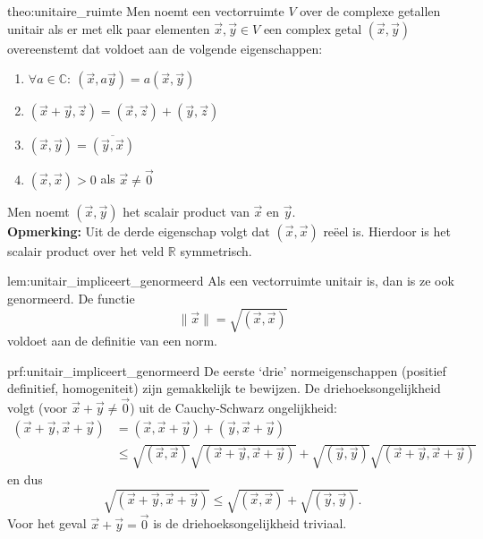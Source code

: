 \begin{theo}{theo:unitaire_ruimte}
    Men noemt een vectorruimte $V$ over de complexe getallen unitair als er met elk paar elementen $\vec{x}, \vec{y} \in V$ een complex getal $(\vec{x},\vec{y})$ overeenstemt dat voldoet aan de volgende eigenschappen:
    \begin{enumerate}
        \item $\forall a \in \mathbb{C}: \ (\vec{x},a\vec{y}) = a(\vec{x},\vec{y})$
        \item $(\vec{x} + \vec{y},\vec{z}) = (\vec{x},\vec{z}) + (\vec{y},\vec{z})$
        \item $(\vec{x},\vec{y}) = \overline{(\vec{y},\vec{x})}$
        \item $(\vec{x},\vec{x}) > 0$ als $\vec{x} \neq \vec{0}$
    \end{enumerate}
    Men noemt $(\vec{x},\vec{y})$ het scalair product van $\vec{x}$ en $\vec{y}$. \\

    \textbf{Opmerking:} Uit de derde eigenschap volgt dat $(\vec{x},\vec{x})$ reëel is. Hierdoor is het scalair product over het veld $\mathbb{R}$ symmetrisch.
\end{theo}

\begin{lem}{lem:unitair_impliceert_genormeerd}
    Als een vectorruimte unitair is, dan is ze ook genormeerd. De functie
    \begin{equation*}
        \| \vec{x} \| = \sqrt{(\vec{x},\vec{x})}
    \end{equation*}
    voldoet aan de definitie van een norm.
\end{lem}

\newpage

\begin{prf}{prf:unitair_impliceert_genormeerd}
    De eerste `drie' normeigenschappen (positief definitief, homogeniteit) zijn gemakkelijk te bewijzen. De driehoeksongelijkheid volgt (voor $\vec{x} + \vec{y} \neq \vec{0}$) uit de Cauchy-Schwarz ongelijkheid:
    \begin{align*}
        (\vec{x} + \vec{y},\vec{x} + \vec{y}) 
            &= (\vec{x}, \vec{x} + \vec{y}) + (\vec{y}, \vec{x} + \vec{y}) \\
            &\leq \sqrt{(\vec{x},\vec{x})} \sqrt{(\vec{x} + \vec{y},\vec{x} + \vec{y})} + \sqrt{(\vec{y},\vec{y})} \sqrt{(\vec{x} + \vec{y},\vec{x} + \vec{y})} 
    \end{align*}
    en dus
    \begin{equation*}
        \sqrt{(\vec{x} + \vec{y},\vec{x} + \vec{y})} \leq \sqrt{(\vec{x},\vec{x})} + \sqrt{(\vec{y},\vec{y})}.
    \end{equation*}
    Voor het geval $\vec{x} + \vec{y} = \vec{0}$ is de driehoeksongelijkheid triviaal.
\end{prf}

